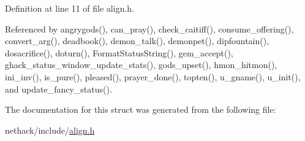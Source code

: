 Definition at line 11 of file align.\+h.



Referenced by angrygods(), can\+\_\+pray(), check\+\_\+caitiff(), consume\+\_\+offering(), convert\+\_\+arg(), deadbook(), demon\+\_\+talk(), demonpet(), dipfountain(), dosacrifice(), doturn(), Format\+Status\+String(), gem\+\_\+accept(), ghack\+\_\+status\+\_\+window\+\_\+update\+\_\+stats(), gods\+\_\+upset(), hmon\+\_\+hitmon(), ini\+\_\+inv(), is\+\_\+pure(), pleased(), prayer\+\_\+done(), topten(), u\+\_\+gname(), u\+\_\+init(), and update\+\_\+fancy\+\_\+status().



The documentation for this struct was generated from the following file\+:\begin{DoxyCompactItemize}
\item 
nethack/include/\hyperlink{align_8h}{align.\+h}\end{DoxyCompactItemize}
